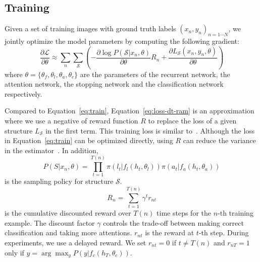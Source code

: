 \documentclass[10pt,twocolumn,letterpaper]{article}
\newcommand{\pian}[2]{\frac{\partial #1}{\partial #2}}
\begin{document}
\subsection{Training}

Given a set of training images with ground truth labels $(x_n, y_n)_{n=1\cdots N}$, we jointly optimize the model parameters by computing the following gradient:
\begin{equation}
\pian{\mathcal{L}}{\theta} \approx \sum_n \sum_{\mathcal{S}} \left( - \pian{\log P(\mathcal{S}|x_n, \theta)}{\theta}R_n + \pian{L_\mathcal{S}(x_n, y_n, \theta)}{\theta} \right)
\label{eq:loss-dt-ram}
\end{equation}
where $\theta = \{\theta_f, \theta_l, \theta_a, \theta_c\}$ are the parameters of the recurrent network, the attention network, the stopping network and the classification network respectively.

Compared to Equation~\ref{eq:train}, Equation~\ref{eq:loss-dt-ram} is an approximation where we use a negative of reward function $R$ to replace the loss of a given structure $L_\mathcal{S}$ in the first term.
This training loss is similar to~\cite{mnih2014recurrent, ba2014multiple}.
Although the loss in Equation~\ref{eq:train} can be optimized directly, using $R$ can reduce the variance in the estimator~\cite{ba2014multiple}.
In addition,
\begin{equation}
P(S|x_n, \theta) = \prod_{t=1}^{T(n)} \pi(l_t | f_l(h_t, \theta_l)) \pi(a_t | f_a(h_t, \theta_a))
\end{equation}
is the sampling policy for structure $\mathcal{S}$.
\begin{equation}
  R_n = \sum_{t=1}^{T(n)} \gamma^t r_{nt}
\end{equation}
is the cumulative discounted reward over $T(n)$ time steps for the $n$-th training example.
The discount factor $\gamma$ controls the trade-off between making correct classification and taking more attentions.
$r_{nt}$ is the reward at $t$-th step.
During experiments, we use a delayed reward.
We set $r_{nt}=0$ if $t \neq T(n)$ and $r_{nT}=1$ only if $y = \arg\max_y P(y|f_c(h_T, \theta_c))$.
\end{document}
